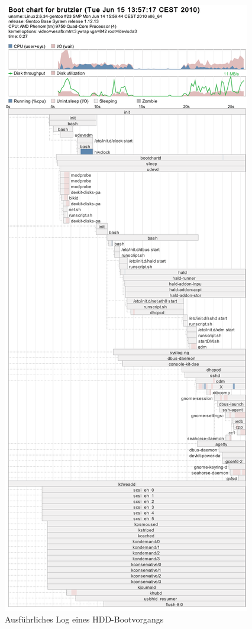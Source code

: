 \begin{figure}[H]\centering
	\includegraphics[scale=0.4]{figures/appendix/bootchart-hdd}
    \caption{Ausführliches Log eines HDD-Bootvorgangs}
    \label{img:bootchart-hdd}
\end{figure}

